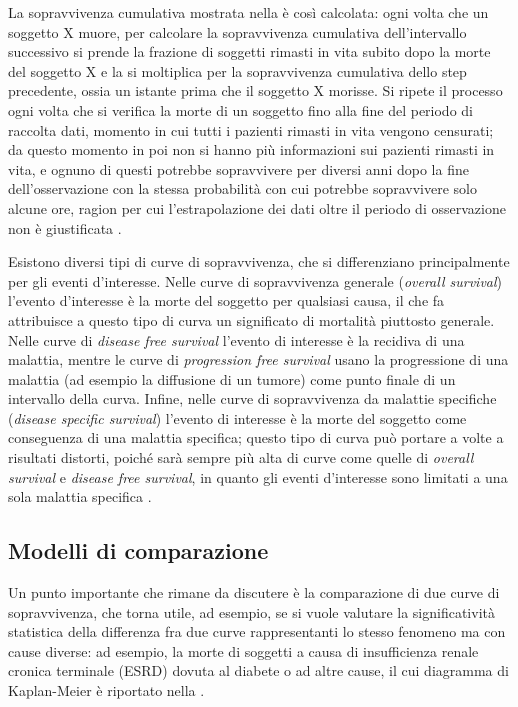 La sopravvivenza cumulativa mostrata nella  è così calcolata: ogni volta che un soggetto X muore, per calcolare la sopravvivenza cumulativa dell'intervallo successivo si prende la frazione di soggetti rimasti in vita subito dopo la morte del soggetto X e la si moltiplica per la sopravvivenza cumulativa dello step precedente, ossia un istante prima che il soggetto X morisse. Si ripete il processo ogni volta che si verifica la morte di un soggetto fino alla fine del periodo di raccolta dati, momento in cui tutti i pazienti rimasti in vita vengono censurati; da questo momento in poi non si hanno più informazioni sui pazienti rimasti in vita, e ognuno di questi potrebbe sopravvivere per diversi anni dopo la fine dell'osservazione con la stessa probabilità con cui potrebbe sopravvivere solo alcune ore, ragion per cui l'estrapolazione dei dati oltre il periodo di osservazione non è giustificata \cite{Rich2010}.

Esistono diversi tipi di curve di sopravvivenza, che si differenziano principalmente per gli eventi d'interesse. Nelle curve di sopravvivenza generale (\textit{overall survival}) l'evento d'interesse è la morte del soggetto per qualsiasi causa, il che fa attribuisce a questo tipo di curva un significato di mortalità piuttosto generale. Nelle curve di \textit{disease free survival} l'evento di interesse è la recidiva di una malattia, mentre le curve di \textit{progression free survival} usano la progressione di una malattia (ad esempio la diffusione di un tumore) come punto finale di un intervallo della curva. Infine, nelle curve di sopravvivenza da malattie specifiche (\textit{disease specific survival}) l'evento di interesse è la morte del soggetto come conseguenza di una malattia specifica; questo tipo di curva può portare a volte a risultati distorti, poiché sarà sempre più alta di curve come quelle di \textit{overall survival} e \textit{disease free survival}, in quanto gli eventi d'interesse sono limitati a una sola malattia specifica \cite{Rich2010}.

\subsection{Modelli di comparazione}\label{confronto}
Un punto importante che rimane da discutere è la comparazione di due curve di sopravvivenza, che torna utile, ad esempio, se si vuole valutare la significatività statistica della differenza fra due curve rappresentanti lo stesso fenomeno ma con cause diverse: ad esempio, la morte di soggetti a causa di insufficienza renale cronica terminale (ESRD) dovuta al diabete o ad altre cause, il cui diagramma di Kaplan-Meier è riportato nella .

